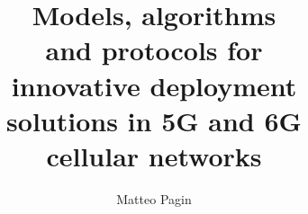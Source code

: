 \usepackage{bookmark}

%

\usepackage[%
  autocite     = plain,
  backend      = biber,
  doi          = true,
  url          = true,
  giveninits   = true,
  hyperref     = true,
  maxbibnames  = 99,
  maxcitenames = 99,
  sorting		= none,
  style        = numeric-comp,
  ]{biblatex}
\hypersetup{
  colorlinks=true,
  citecolor=UNIPDRED,
}
  
 \usepackage{xurl}





\onehalfspacing

\renewcommand{\th}{\textsuperscript{\textup{th}}\xspace}



\makeindex
\makeglossaries


\title{\textcolor{UNIPDRED}{Models, algorithms\\[0.2cm] and protocols for\\[0.2cm] innovative deployment\\[0.2cm] solutions in 5G and 6G\\[0.2cm] cellular networks}}
\author{Matteo Pagin}



\frontmatter
  
  
  
  \newpage\phantom{justskipthepage}

